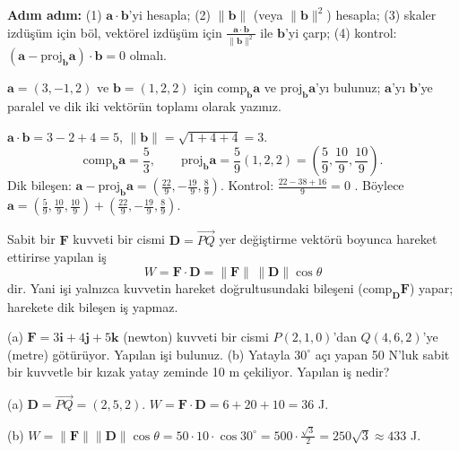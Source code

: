 \textbf{Adım adım:} (1) $\mathbf a\cdot\mathbf b$'yi hesapla; (2) $\|\mathbf b\|$ (veya $\|\mathbf b\|^2$) hesapla; (3) skaler izdüşüm için böl, vektörel izdüşüm için $\frac{\mathbf a\cdot\mathbf b}{\|\mathbf b\|^2}$ ile $\mathbf b$'yi çarp; (4) kontrol: $(\mathbf a-\text{proj}_{\mathbf b}\mathbf a)\cdot\mathbf b=0$ olmalı.

\begin{soru}
$\mathbf a=(3,-1,2)$ ve $\mathbf b=(1,2,2)$ için $\text{comp}_{\mathbf b}\mathbf a$ ve $\text{proj}_{\mathbf b}\mathbf a$'yı bulunuz; $\mathbf a$'yı $\mathbf b$'ye paralel ve dik iki vektörün toplamı olarak yazınız.
\end{soru}
\begin{cevap}
$\mathbf a\cdot\mathbf b=3-2+4=5$, $\|\mathbf b\|=\sqrt{1+4+4}=3$.
\[
\text{comp}_{\mathbf b}\mathbf a=\frac53,\qquad
\text{proj}_{\mathbf b}\mathbf a=\frac{5}{9}(1,2,2)=\left(\frac59,\frac{10}{9},\frac{10}{9}\right).
\]
Dik bileşen: $\mathbf a-\text{proj}_{\mathbf b}\mathbf a=\left(\frac{22}{9},-\frac{19}{9},\frac{8}{9}\right)$.
Kontrol: $\frac{22-38+16}{9}=0$ \checkmark. Böylece
$\mathbf a=\left(\frac59,\frac{10}{9},\frac{10}{9}\right)+\left(\frac{22}{9},-\frac{19}{9},\frac{8}{9}\right)$.
\end{cevap}

\begin{teorem}[İş]
Sabit bir $\mathbf F$ kuvveti bir cismi $\mathbf D=\overrightarrow{PQ}$ yer değiştirme vektörü boyunca hareket ettirirse yapılan iş
\[
W=\mathbf F\cdot\mathbf D=\|\mathbf F\|\,\|\mathbf D\|\cos\theta
\]
dir. Yani işi yalnızca kuvvetin hareket doğrultusundaki bileşeni ($\text{comp}_{\mathbf D}\mathbf F$) yapar; harekete dik bileşen iş yapmaz.
\end{teorem}

\begin{soru}
(a) $\mathbf F=3\mathbf i+4\mathbf j+5\mathbf k$ (newton) kuvveti bir cismi $P(2,1,0)$'dan $Q(4,6,2)$'ye (metre) götürüyor. Yapılan işi bulunuz.
(b) Yatayla $30^\circ$ açı yapan 50 N'luk sabit bir kuvvetle bir kızak yatay zeminde 10 m çekiliyor. Yapılan iş nedir?
\end{soru}
\begin{cevap}
(a) $\mathbf D=\overrightarrow{PQ}=(2,5,2)$. $W=\mathbf F\cdot\mathbf D=6+20+10=36$ J.

(b) $W=\|\mathbf F\|\|\mathbf D\|\cos\theta=50\cdot10\cdot\cos30^\circ=500\cdot\frac{\sqrt3}{2}=250\sqrt3\approx433$ J.
\end{cevap}

